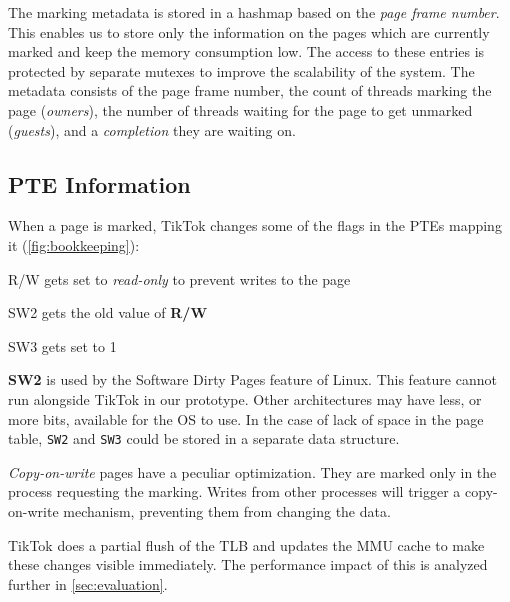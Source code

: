 \documentclass[conference]{IEEEtran}
\newcommand{\sysname}{TikTok}
\begin{document}
The marking metadata is stored in a hashmap based on the \emph{page frame
number}. This enables us to store only the information on the pages which are
currently marked and keep the memory consumption low. The access to these entries
is protected by separate mutexes to improve the scalability of the system. The
metadata consists of the page frame number, the count of threads marking the page
(\emph{owners}), the number of threads waiting for the page to get unmarked
(\emph{guests}), and a \emph{completion} they are waiting on. 

\subsection{PTE Information}
\label{subsec:pageinfo}

When a page is marked, \sysname{} changes some of the flags in the PTEs mapping it
(\autoref{fig:bookkeeping}):

\begin{LaTeXdescription}
  \item[R/W] gets set to \emph{read-only} to prevent writes to the page
  \item[SW2] gets the old value of \textbf{R/W}
  \item[SW3] gets set to 1 
\end{LaTeXdescription}

\textbf{SW2} is used by the Software Dirty Pages
feature of Linux. This feature cannot run alongside \sysname{} in our prototype.
Other architectures may have less, or more bits, available for the OS to use. In
the case of lack of space in the page table, \texttt{SW2} and \texttt{SW3} could
be stored in a separate data structure.

\emph{Copy-on-write} pages have a peculiar optimization. They are marked only in
the process requesting the marking. Writes from other processes will trigger a
copy-on-write mechanism, preventing them from changing the data.

\sysname{} does a partial flush of the TLB and updates the MMU cache to make these
changes visible immediately. The performance impact of this is analyzed further
in \autoref{sec:evaluation}.
\end{document}
